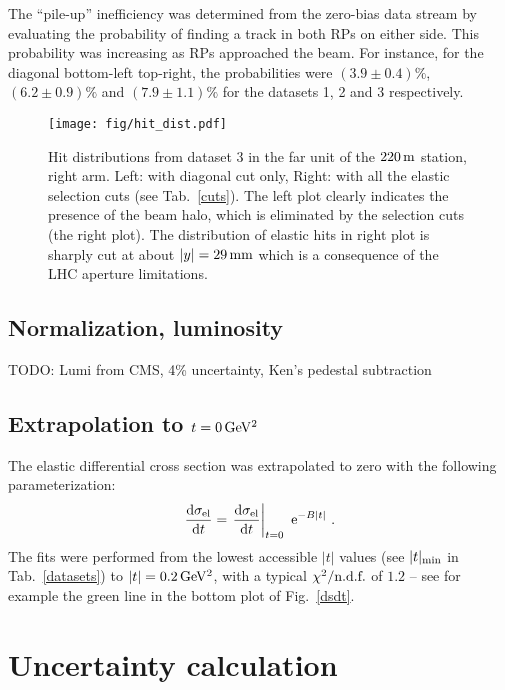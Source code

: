 \documentclass[doublecol]{../macros/epl2}
\def\d{{\rm d}}
\def\un#1{\,{\rm #1}}
\def\e{{\rm e}}
\begin{document}
The ``pile-up'' inefficiency was determined from the zero-bias data stream by evaluating the probability of finding a track in both RPs on either side. This probability was increasing as RPs approached the beam. For instance, for the diagonal bottom-left top-right, the probabilities were $(3.9 \pm 0.4)\%$, $(6.2 \pm 0.9)\%$ and $(7.9 \pm 1.1)\%$ for the datasets 1, 2 and 3 respectively.


\begin{figure*}
\begin{center}
\texttt{[image: fig/hit\_dist.pdf]}
\vskip-5mm
\caption{Hit distributions from dataset 3 in the far unit of the $220\un{m}$ station, right arm. Left: with diagonal cut only, Right: with all the elastic selection cuts (see Tab.~\ref{cuts}). The left plot clearly indicates the presence of the beam halo, which is eliminated by the selection cuts (the right plot). The distribution of elastic hits in right plot is sharply cut at about $|y| = 29\un{mm}$ which is a consequence of the LHC aperture limitations. }
\label{hit dist}
\end{center}
\end{figure*}

\subsection{Normalization, luminosity}

TODO: Lumi from CMS, 4\% uncertainty, Ken's pedestal subtraction

\subsection{Extrapolation to $t=0\,\rm GeV^2$}

The elastic differential cross section was extrapolated to zero with the following parameterization:
\begin{equation}
\label{extrapolation}
{\d\sigma_{\rm el}\over \d t} = \left. {\d\sigma_{\rm el}\over \d t}\right|_{t=0} \ \e^{-B|t|}\ .
\end{equation}
The fits were performed from the lowest accessible $|t|$ values (see $|t|_{\rm min}$ in Tab.~\ref{datasets}) to $|t| = 0.2\un{GeV^2}$, with a typical $\chi^2/\hbox{n.d.f.}$ of $1.2$ -- see for example the green line in the bottom plot of Fig.~\ref{dsdt}.

\section{Uncertainty calculation}
\end{document}
